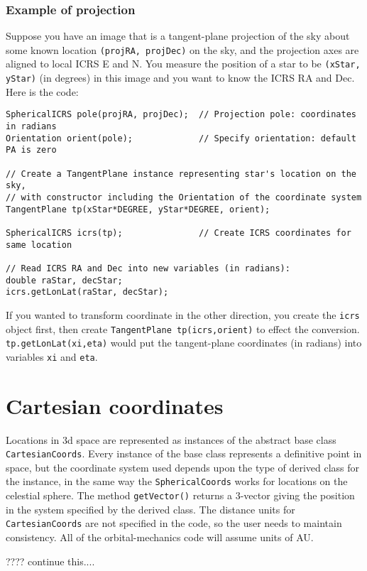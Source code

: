 \documentclass[11pt,preprint,flushrt]{aastex}
\begin{document}
\subsubsection{Example of projection}
Suppose you have an image that is a tangent-plane projection of the sky about some known location {\tt (projRA, projDec)} on the sky, and the projection axes are aligned to local ICRS E and N.  You measure the position of a star to be {\tt (xStar, yStar)} (in degrees) in this image and you want to know the ICRS RA and Dec.  Here is the code:
\begin{verbatim}
SphericalICRS pole(projRA, projDec);  // Projection pole: coordinates in radians
Orientation orient(pole);             // Specify orientation: default PA is zero

// Create a TangentPlane instance representing star's location on the sky,
// with constructor including the Orientation of the coordinate system
TangentPlane tp(xStar*DEGREE, yStar*DEGREE, orient);

SphericalICRS icrs(tp);               // Create ICRS coordinates for same location

// Read ICRS RA and Dec into new variables (in radians):
double raStar, decStar;
icrs.getLonLat(raStar, decStar);
\end{verbatim}
If you wanted to transform coordinate in the other direction, you create the {\tt icrs} object first, then create {\tt TangentPlane tp(icrs,orient)} to effect the conversion.  {\tt tp.getLonLat(xi,eta)} would put the tangent-plane coordinates (in radians) into variables {\tt xi} and {\tt eta}.

\section{Cartesian coordinates}
Locations in 3d space are represented as instances of the abstract base class {\tt CartesianCoords}. Every instance of the base class represents a definitive point in space, but the coordinate system used depends upon the type of derived class for the instance, in the same way the {\tt SphericalCoords} works for locations on the celestial sphere.  The method {\tt getVector()} returns a 3-vector giving the position in the system specified by the derived class.  The distance units for {\tt CartesianCoords} are not specified in the code, so the user needs to maintain consistency.  All of the orbital-mechanics code will assume units of AU.

???? continue this....
\end{document}
